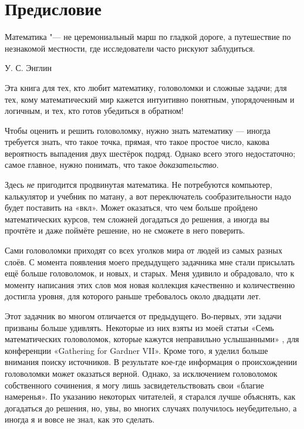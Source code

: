 \chapter*{Предисловие}

\setlength{\epigraphwidth}{.6\textwidth}
\epigraph{Математика "--- не церемониальный марш по гладкой дороге, а путешествие по незнакомой местности, где исследователи часто рискуют заблудиться.
}{У. С. Энглин %
}

Эта книга для тех, кто любит математику, головоломки и сложные задачи;
для тех, кому математический мир кажется интуитивно понятным, упорядоченным и логичным, и тех, кто готов убедиться в обратном!

Чтобы оценить и решить головоломку, нужно знать математику --- 
иногда требуется знать, что такое точка, прямая, что такое простое число, какова вероятность выпадения двух шестёрок подряд.
Однако всего этого недостаточно; самое главное, нужно понимать, что такое \emph{доказательство}.

Здесь \emph{не} пригодится продвинутая математика.
Не потребуются компьютер, калькулятор и учебник по матану,
а вот переключатель сообразительности надо будет поставить на «вкл».
Может оказаться, что чем больше пройдено математических курсов, тем сложней догадаться до решения,
а иногда вы прочтёте и даже поймёте решение, но не сможете в него поверить.

Сами головоломки приходят со всех уголков мира от людей из самых разных слоёв.
С момента появления моего предыдущего задачника мне стали присылать ещё больше головоломок, и новых, и старых.
Меня удивило и обрадовало, что к моменту написания этих слов моя новая коллекция качественно и количественно достигла уровня, для которого раньше требовалось около двадцати лет.

Этот задачник во многом отличается от предыдущего.
Во-первых, эти задачи призваны больше удивлять.
Некоторые из них взяты из моей статьи «Семь математических головоломок, которые кажутся неправильно услышанными» \cite{winkler-7}, для конференции «Gathering for Gard\-ner VII».
Кроме того, я уделил больше внимания поиску источников.
В результате кое-где информация о происхождении головоломки может оказаться верной.
Однако, за исключением головоломок собственного сочинения, я могу лишь засвидетельствовать свои «благие намеренья».
По указанию некоторых читателей, я старался лучше объяснять, как догадаться до решения,
но, увы, во многих случаях получилось неубедительно, а иногда я и вовсе не знал, как это сделать.

